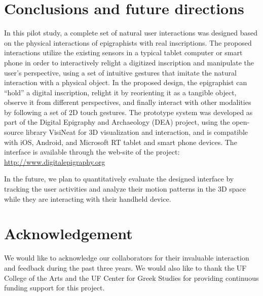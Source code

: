 \documentclass[amsthm,ebook]{saparticle}
\begin{document}
\section{Conclusions and future directions}


\noindent In this pilot study, a complete set of natural user interactions was designed based on the physical interactions of
epigraphists with real inscriptions. The proposed interactions utilize the existing sensors in a typical tablet
computer or smart phone in order to interactively relight a digitized inscription and manipulate the user's
perspective, using a set of intuitive gestures that imitate the natural interaction with a physical object. In the
proposed design, the epigraphist can ``hold'' a digital inscription, relight it by
reorienting it as a tangible object, observe it from different perspectives, and finally interact with other modalities
by following a set of 2D touch gestures. The prototype system was developed as part of the Digital Epigraphy and
Archaeology (DEA) project, using the open-source library VisiNeat for 3D visualization and interaction, and is compatible
with iOS, Android, and Microsoft RT tablet and smart phone devices. The interface is available through the web-site of
the project: \url{http://www.digitalepigraphy.org}

In the future, we plan to quantitatively evaluate the designed interface by tracking the user activities and analyze
their motion patterns in the 3D space while they are interacting with their handheld device. 
\nocite{osman_exploratory_2011}



\section*{Acknowledgement}

\noindent We would like to acknowledge our collaborators for their invaluable interaction and feedback during the past three
years. We would also like to thank the UF College of the Arts and the UF Center for Greek Studies for providing
continuous funding support for this project. 



\end{document}
